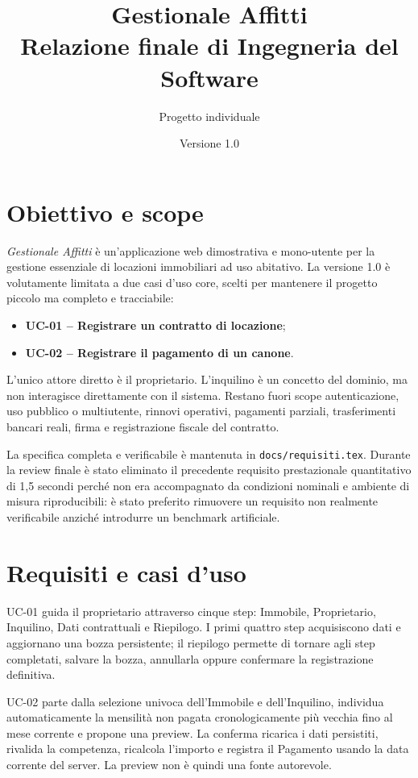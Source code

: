 \documentclass[11pt,a4paper]{article}
\title{Gestionale Affitti\\Relazione finale di Ingegneria del Software}
\author{Progetto individuale}
\date{Versione 1.0}
\begin{document}
\maketitle
\tableofcontents
\newpage

\section{Obiettivo e scope}

\emph{Gestionale Affitti} è un'applicazione web dimostrativa e mono-utente per la gestione essenziale di locazioni immobiliari ad uso abitativo. La versione 1.0 è volutamente limitata a due casi d'uso core, scelti per mantenere il progetto piccolo ma completo e tracciabile:

\begin{itemize}
  \item \textbf{UC-01 -- Registrare un contratto di locazione};
  \item \textbf{UC-02 -- Registrare il pagamento di un canone}.
\end{itemize}

L'unico attore diretto è il proprietario. L'inquilino è un concetto del dominio, ma non interagisce direttamente con il sistema. Restano fuori scope autenticazione, uso pubblico o multiutente, rinnovi operativi, pagamenti parziali, trasferimenti bancari reali, firma e registrazione fiscale del contratto.

La specifica completa e verificabile è mantenuta in \texttt{docs/requisiti.tex}. Durante la review finale è stato eliminato il precedente requisito prestazionale quantitativo di 1,5 secondi perché non era accompagnato da condizioni nominali e ambiente di misura riproducibili: è stato preferito rimuovere un requisito non realmente verificabile anziché introdurre un benchmark artificiale.

\section{Requisiti e casi d'uso}

UC-01 guida il proprietario attraverso cinque step: Immobile, Proprietario, Inquilino, Dati contrattuali e Riepilogo. I primi quattro step acquisiscono dati e aggiornano una bozza persistente; il riepilogo permette di tornare agli step completati, salvare la bozza, annullarla oppure confermare la registrazione definitiva.

UC-02 parte dalla selezione univoca dell'Immobile e dell'Inquilino, individua automaticamente la mensilità non pagata cronologicamente più vecchia fino al mese corrente e propone una preview. La conferma ricarica i dati persistiti, rivalida la competenza, ricalcola l'importo e registra il Pagamento usando la data corrente del server. La preview non è quindi una fonte autorevole.
\end{document}
